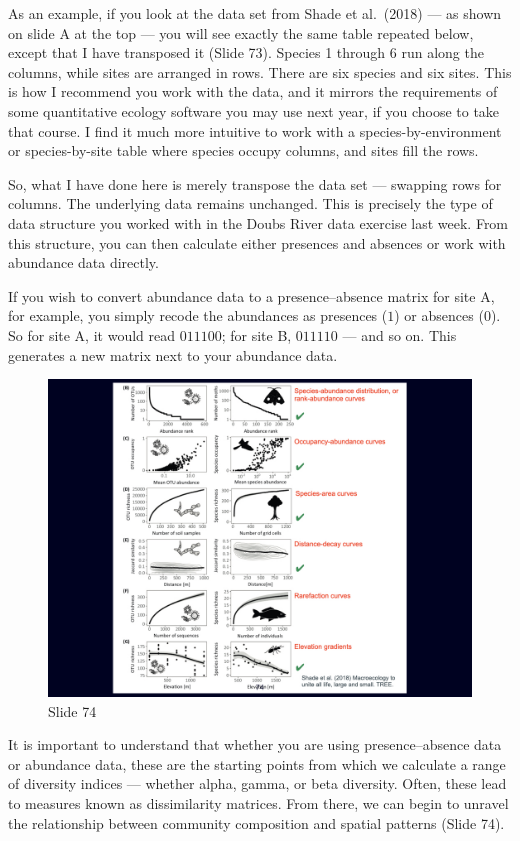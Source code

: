 \documentclass[
  11pt,
]{book}
\begin{document}
As an example, if you look at the data set from Shade et al.~(2018) ---
as shown on slide A at the top --- you will see exactly the same table
repeated below, except that I have transposed it (Slide 73). Species 1
through 6 run along the columns, while sites are arranged in rows. There
are six species and six sites. This is how I recommend you work with the
data, and it mirrors the requirements of some quantitative ecology
software you may use next year, if you choose to take that course. I
find it much more intuitive to work with a species-by-environment or
species-by-site table where species occupy columns, and sites fill the
rows.

So, what I have done here is merely transpose the data set --- swapping
rows for columns. The underlying data remains unchanged. This is
precisely the type of data structure you worked with in the Doubs River
data exercise last week. From this structure, you can then calculate
either presences and absences or work with abundance data directly.

If you wish to convert abundance data to a presence--absence matrix for
site A, for example, you simply recode the abundances as presences
(\(1\)) or absences (\(0\)). So for site A, it would read \(011100\);
for site B, \(011110\) --- and so on. This generates a new matrix next
to your abundance data.

\begin{figure}[ht]
\centering
\includegraphics[width=0.8\linewidth]{../images/BDC334/BDC334-074.jpeg}
\caption*{Slide 74}
\end{figure}

It is important to understand that whether you are using
presence--absence data or abundance data, these are the starting points
from which we calculate a range of diversity indices --- whether alpha,
gamma, or beta diversity. Often, these lead to measures known as
dissimilarity matrices. From there, we can begin to unravel the
relationship between community composition and spatial patterns (Slide
74).
\end{document}

